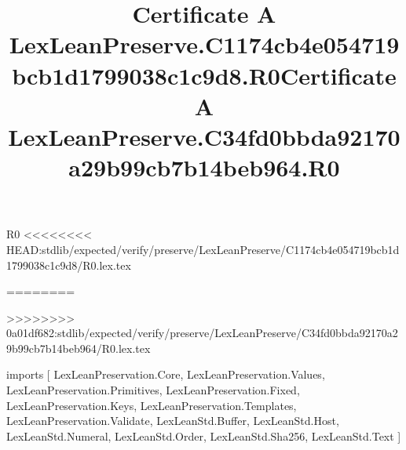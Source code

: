 \begin{lexlean}{R0}
<<<<<<<< HEAD:stdlib/expected/verify/preserve/LexLeanPreserve/C1174cb4e054719bcb1d1799038c1c9d8/R0.lex.tex
\title{Certificate A LexLeanPreserve.C1174cb4e054719bcb1d1799038c1c9d8.R0}
========
\title{Certificate A LexLeanPreserve.C34fd0bbda92170a29b99cb7b14beb964.R0}
>>>>>>>> 0a01df682:stdlib/expected/verify/preserve/LexLeanPreserve/C34fd0bbda92170a29b99cb7b14beb964/R0.lex.tex
\begin{coremodule}
imports [
  LexLeanPreservation.Core,
  LexLeanPreservation.Values,
  LexLeanPreservation.Primitives,
  LexLeanPreservation.Fixed,
  LexLeanPreservation.Keys,
  LexLeanPreservation.Templates,
  LexLeanPreservation.Validate,
  LexLeanStd.Buffer,
  LexLeanStd.Host,
  LexLeanStd.Numeral,
  LexLeanStd.Order,
  LexLeanStd.Sha256,
  LexLeanStd.Text
]


\end{coremodule}
\end{lexlean}
